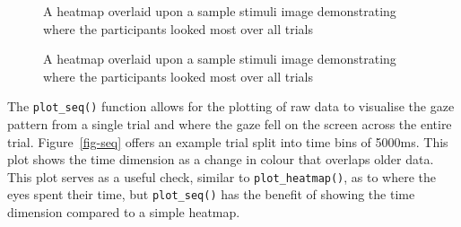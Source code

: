 \documentclass[
  man,
  floatsintext,
  longtable,
  nolmodern,
  notxfonts,
  notimes,
  colorlinks=true,linkcolor=blue,citecolor=blue,urlcolor=blue]{apa7}
\begin{document}
\begin{figure}[H]

\caption{\label{fig-heatmap}A heatmap overlaid upon a sample stimuli
image demonstrating where the participants looked most over all trials}


\end{figure}%

\begin{figure}[H]

\caption{\label{fig-heatmap-alpha-update}A heatmap overlaid upon a
sample stimuli image demonstrating where the participants looked most
over all trials}


\end{figure}%

The \texttt{plot\_seq()} function allows for the plotting of raw data to
visualise the gaze pattern from a single trial and where the gaze fell
on the screen across the entire trial. Figure~\ref{fig-seq} offers an
example trial split into time bins of 5000ms. This plot shows the time
dimension as a change in colour that overlaps older data. This plot
serves as a useful check, similar to \texttt{plot\_heatmap()}, as to
where the eyes spent their time, but \texttt{plot\_seq()} has the
benefit of showing the time dimension compared to a simple heatmap.
\end{document}
